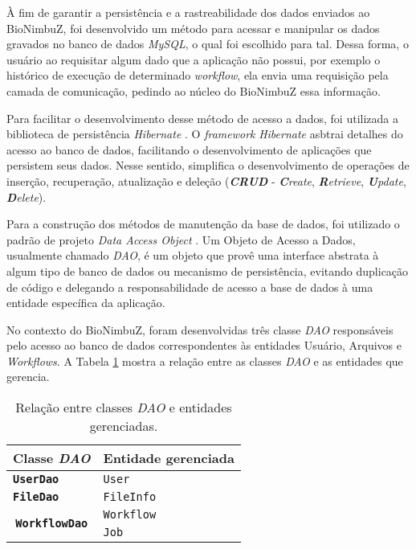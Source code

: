À fim de garantir a persistência e a rastreabilidade dos dados enviados ao BioNimbuZ, foi desenvolvido um método para acessar e manipular os dados gravados no banco de dados \textit{MySQL}, o qual foi escolhido para tal. Dessa forma, o usuário ao requisitar algum dado que a aplicação não possui, por exemplo o histórico de execução de determinado \textit{workflow}, ela envia uma requisição pela camada de comunicação, pedindo ao núcleo do BioNimbuZ essa informação. 

Para facilitar o desenvolvimento desse método de acesso a dados, foi utilizada a biblioteca de persistência \textit{Hibernate} \cite{hibernate_url}. O \textit{framework} \textit{Hibernate} asbtrai detalhes do acesso ao banco de dados, facilitando o desenvolvimento de aplicações que persistem seus dados. Nesse sentido, simplifica o desenvolvimento de operações de inserção, recuperação, atualização e deleção (\textit{\textbf{CRUD}} - \textit{\textbf{C}reate}, \textit{\textbf{R}etrieve}, \textit{\textbf{U}pdate}, \textit{\textbf{D}elete}).

Para a construção dos métodos de manutenção da base de dados, foi utilizado o padrão de projeto \textit{Data Access Object} \cite{dao}. Um Objeto de Acesso a Dados, usualmente chamado \textit{DAO}, é um objeto que provê uma interface abstrata à algum tipo de banco de dados ou mecanismo de persistência, evitando duplicação de código e delegando a  responsabilidade de acesso a base de dados à uma entidade específica da aplicação.

No contexto do BioNimbuZ, foram desenvolvidas três classe \textit{DAO} responsáveis pelo acesso ao banco de dados correspondentes às entidades Usuário, Arquivos e \textit{Workflows}. A Tabela \ref{tab:dao_entidade} mostra a relação entre as classes \textit{DAO} e as entidades que gerencia.

\begin{table}[H]
\centering
\begin{tabular}{||c|c||}
\hline
\textbf{Classe \textit{DAO}} & \textbf{Entidade gerenciada}  \\
\hline
\hline
\multicolumn{1}{||l|}{\textbf{\texttt{UserDao}}}	& \multicolumn{1}{l||}{\texttt{User}} \\ 
\hline
\multicolumn{1}{||l|}{\textbf{\texttt{FileDao}}}	& \multicolumn{1}{l||}{\texttt{FileInfo}} \\
\hline
\multirow{2}{*}{\textbf{\texttt{WorkflowDao}}} & \multicolumn{1}{l||}{\texttt{Workflow}} \\ 
\cline{2-2}
& \multicolumn{1}{l||}{\texttt{Job}} \\ 
\hline
\end{tabular}
\caption{Relação entre classes \textit{DAO} e entidades gerenciadas.}
\label{tab:dao_entidade}
\end{table}

